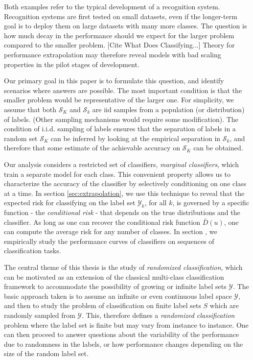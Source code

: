 \documentclass[twoside,11pt]{article}
\begin{document}
Both examples refer to the typical development of a recognition system. 
Recognition systems are first tested on small datasets, even 
if the longer-term goal is to deploy them on large datasets with many more classes.
The question is how much decay in the performance should we expect for the larger problem compared to the smaller problem. [Cite What Does Classifying...]
Theory for performance extrapolation may therefore
reveal models with bad scaling properties in the pilot stages of
development.

Our primary goal in this paper is to formulate this question, and
identify scenarios where answers are possible. 
The most important condition is that the smaller problem would be 
representative of the larger one. For simplicity, we
assume that both $\mathcal{S}_K$ and $\mathcal{S}_k$ are iid samples
from a population (or distribution) of labels. (Other sampling 
mechanisms would require some modification). 
The condition of i.i.d. sampling of labels ensures that the
separation of labels in a random set $\mathcal{S}_K$ can be inferred by
looking at the empirical separation in $\mathcal{S}_k$, and
therefore that some estimate of the achievable accuracy on
$\mathcal{S}_K$ can be obtained.

Our analysis considers a restricted set of classifiers,
\emph{marginal classifiers}, which train a separate model for each class. 
This convenient property allows us to
characterize the accuracy of the classifier by selectively
conditioning on one class at a time.  In section \ref{sec:extrapolation}, we use this
technique to reveal that the expected risk for classifying on the
label set $\mathcal{Y}_k$, for all $k$, is governed by a
specific function - the \emph{conditional risk} -  
that depends on the true distributions and the classifier. 
As long as one can recover the conditional risk
function $\bar{D}(u)$, one can compute the average risk for any number
of classes. In section \label{sec:extrapolation_example}, we
empirically study the performance curves of classifiers on sequences
of classification tasks. 



The central theme of this thesis is the study of \emph{randomized
  classification}, which can be motivated as an extension of the
classical multi-class classification framework to accommodate the
possibility of growing or infinite label sets $\mathcal{Y}$. The basic
approach taken is to assume an infinite or even continuous label space
$\mathcal{Y}$, and then to study the problem of classification on
finite label sets $S$ which are randomly sampled from $\mathcal{Y}.$
This, therefore defines a \emph{randomized classification} problem
where the label set is finite but may vary from instance to instance.
One can then proceed to answer questions about the variability of the
performance due to randomness in the labels, or how performance
changes depending on the size of the random label set.
\end{document}
